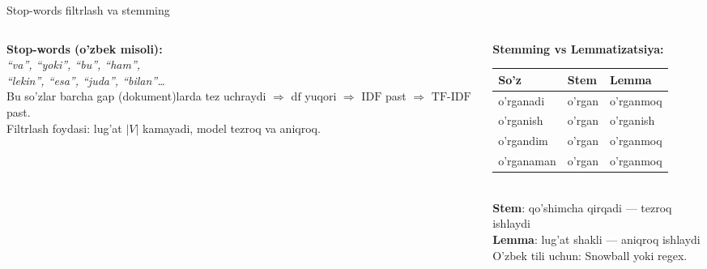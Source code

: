 \documentclass[aspectratio=169,11pt]{beamer}
\begin{document}
\begin{frame}{Stop-words filtrlash va stemming}
  \begin{columns}[T]
    \begin{column}{0.48\textwidth}
      \textbf{Stop-words (o'zbek misoli):}\\[4pt]
      \small
      \textit{``va'', ``yoki'', ``bu'', ``ham'',\\
      ``lekin'', ``esa'', ``juda'', ``bilan''\ldots}\\[4pt]
      \footnotesize
      Bu so'zlar barcha gap (dokument)larda tez uchraydi
      $\Rightarrow$ $\mathrm{df}$ yuqori $\Rightarrow$ $\mathrm{IDF}$ past
      $\Rightarrow$ $\mathrm{TF\text{-}IDF}$ past.\\[4pt]
      Filtrlash foydasi: lug'at $|V|$ kamayadi,
      model tezroq va aniqroq.
    \end{column}
    \begin{column}{0.48\textwidth}
      \textbf{Stemming vs Lemmatizatsiya:}\\[3pt]
      \small
      \begin{tabular}{lll}
        \toprule
        So'z & Stem & Lemma \\
        \midrule
        o'rganadi & o'rgan & o'rganmoq \\
        o'rganish & o'rgan & o'rganish \\
        o'rgandim & o'rgan & o'rganmoq \\
        o'rganaman & o'rgan & o'rganmoq \\
        \bottomrule
      \end{tabular}\\[5pt]
      \footnotesize
      \textbf{Stem}: qo'shimcha qirqadi --- tezroq ishlaydi\\
      \textbf{Lemma}: lug'at shakli --- aniqroq ishlaydi\\[3pt]
      O'zbek tili uchun: Snowball yoki regex.
    \end{column}
  \end{columns}
\end{frame}
\end{document}
